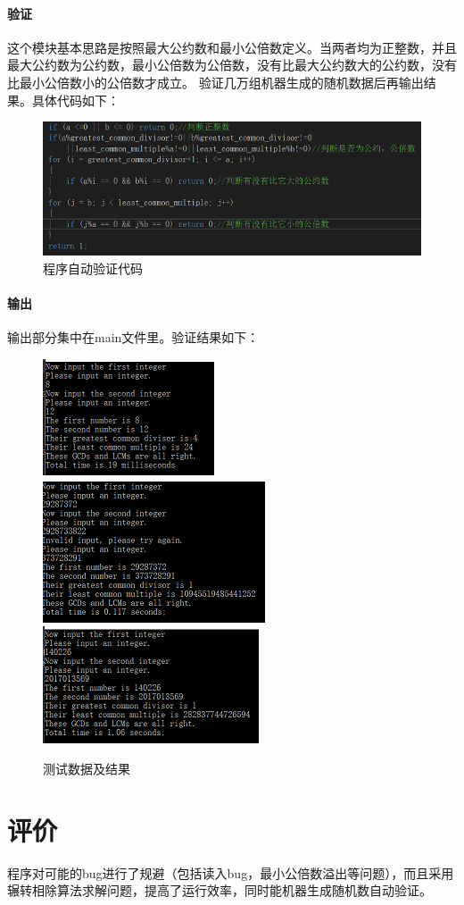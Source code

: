 \documentclass[UTF8]{ctexart}
\begin{document}
    \paragraph{验证}
    这个模块基本思路是按照最大公约数和最小公倍数定义。当两者均为正整数，并且最大公约数为公约数，最小公倍数为公倍数，没有比最大公约数大的公约数，没有比最小公倍数小的公倍数才成立。
    验证几万组机器生成的随机数据后再输出结果。具体代码如下：
     \begin{figure}[htbp]
    	\centering
    	\includegraphics{c.png}
    	\caption{程序自动验证代码}
    \end{figure}
    \paragraph{输出}
    输出部分集中在main文件里。验证结果如下：
    \begin{figure}[htbp]
    	\centering
    	\includegraphics{d1.png}
    	\includegraphics{d2.png}
    	\includegraphics{d3.png}
    	\caption{测试数据及结果}
    \end{figure}
    \section{评价}
    程序对可能的bug进行了规避（包括读入bug，最小公倍数溢出等问题），而且采用辗转相除算法求解问题，提高了运行效率，同时能机器生成随机数自动验证。
    
\end{document}
